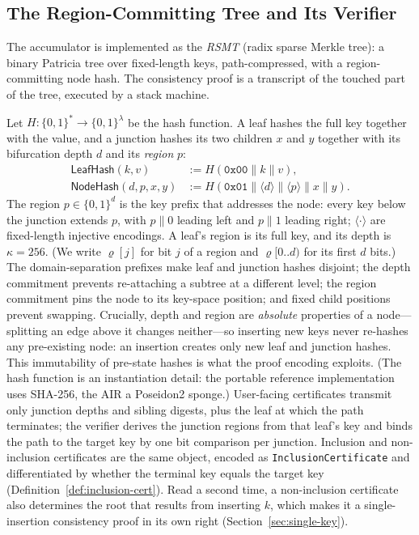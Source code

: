 \documentclass[11pt]{article}
\begin{document}
\subsection{The Region-Committing Tree and Its Verifier}
\label{sec:stack-verifier}

The accumulator is implemented as the \emph{RSMT} (radix sparse Merkle tree): a binary Patricia tree over fixed-length keys, path-compressed, with a region-committing node hash. The consistency proof is a transcript of the touched part of the tree, executed by a stack machine.

Let $H \colon \{0,1\}^{*} \to \{0,1\}^{\lambda}$ be the hash function. A leaf hashes the full key together with the value, and a junction hashes its two children $x$ and $y$ together with its bifurcation depth $d$ and its \emph{region} $p$:
\begin{align*}
  \mathsf{LeafHash}(k,v) &:= H(\texttt{0x00} \parallel k \parallel v),\\
  \mathsf{NodeHash}(d,p,x,y) &:= H(\texttt{0x01} \parallel \langle d\rangle \parallel \langle p\rangle \parallel x \parallel y).
\end{align*}
The region $p \in \{0,1\}^d$ is the key prefix that addresses the node: every key below the junction extends $p$, with $p\|0$ leading left and $p\|1$ leading right; $\langle\cdot\rangle$ are fixed-length injective encodings. A leaf's region is its full key, and its depth is $\kappa = 256$. (We write $\varrho[j]$ for bit $j$ of a region and $\varrho[0..d)$ for its first $d$ bits.) The domain-separation prefixes make leaf and junction hashes disjoint; the depth commitment prevents re-attaching a subtree at a different level; the region commitment pins the node to its key-space position; and fixed child positions prevent swapping. Crucially, depth and region are \emph{absolute} properties of a node---splitting an edge above it changes neither---so inserting new keys never re-hashes any pre-existing node: an insertion creates only new leaf and junction hashes. This immutability of pre-state hashes is what the proof encoding exploits. (The hash function is an instantiation detail: the portable reference implementation uses SHA-256, the AIR a Poseidon2 sponge.) User-facing certificates transmit only junction depths and sibling digests, plus the leaf at which the path terminates; the verifier derives the junction regions from that leaf's key and binds the path to the target key by one bit comparison per junction. Inclusion and non-inclusion certificates are the same object, encoded as \texttt{InclusionCertificate} and differentiated by whether the terminal key equals the target key (Definition~\ref{def:inclusion-cert}). Read a second time, a non-inclusion certificate also determines the root that results from inserting $k$, which makes it a single-insertion consistency proof in its own right (Section~\ref{sec:single-key}).
\end{document}
